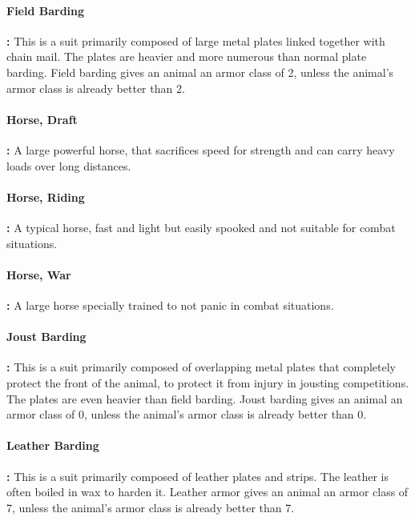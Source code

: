 \begin{multicols*}{2}
\paragraph{Field Barding}\textbf{:} This is a suit primarily composed of large metal plates linked together with chain mail. The plates are heavier and more numerous than normal plate barding. Field barding gives an animal an armor class of 2, unless the animal’s armor class is already better than 2.

\paragraph{Horse, Draft}\textbf{:} A large powerful horse, that sacrifices speed for strength and can carry heavy loads over long distances.

\paragraph{Horse, Riding}\textbf{:} A typical horse, fast and light but easily spooked and not suitable for combat situations.

\paragraph{Horse, War}\textbf{:} A large horse specially trained to not panic in combat situations.

\paragraph{Joust Barding}\textbf{:} This is a suit primarily composed of overlapping metal plates that completely protect the front of the animal, to protect it from injury in jousting competitions. The plates are even heavier than field barding. Joust barding gives an animal an armor class of 0, unless the animal’s armor class is already better than 0.

\paragraph{Leather Barding}\textbf{:} This is a suit primarily composed of leather plates and strips. The leather is often boiled in wax to harden it. Leather armor gives an animal an armor class of 7, unless the animal’s armor class is already better than 7.


\end{multicols*}
